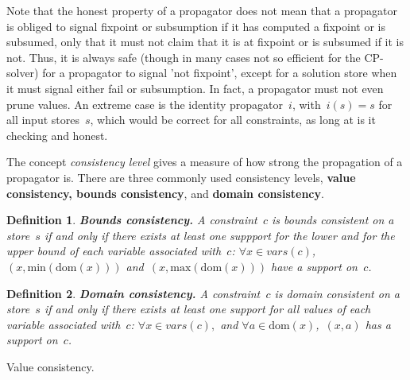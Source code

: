 \documentclass[a4paper,11pt]{article}
\newtheorem{definition}{Definition}
\newcommand{\Todo}[1]{{\color{blue}#1}}
\newcommand{\Dom}[1]{\text{dom}({#1})}
\numberwithin{equation}{section}
\begin{document}
Note that the honest property of a propagator does not mean that a
propagator is obliged to signal fixpoint or subsumption
if it has computed a fixpoint or is subsumed, only that it must not 
claim that it is at fixpoint or is subsumed if it is not. 
Thus, it is always safe 
(though in many cases not so efficient for the CP-solver)
for a propagator to signal 'not fixpoint', except for a solution store
when it must signal either fail or subsumption.
In fact, a propagator must not even prune values. An extreme case is
the identity propagator~$i$, with~$i(s) = s$ for all input stores~$s$,
which would be correct
for all constraints, as long at is it checking and honest.

The concept \emph{consistency level} gives a measure of how strong
the propagation of a propagator is.
There are three commonly used consistency levels,
\textbf{value consistency, bounds consistency}, and \textbf{domain consistency}.


\begin{definition}
  \textbf{Bounds consistency.} A constraint~$c$ is bounds consistent on a store~$s$ 
  if and only if there exists at least one suppport for the lower and for the upper bound of
  each variable associated with~$c$: $\forall x \in vars(c)$,~$(x,\text{min}(\Dom{x}))$
  and~$(x,\text{max}(\Dom{x}))$ 
  have a support on~$c$.
\end{definition}

\begin{definition}
  \textbf{Domain consistency.} A constraint~$c$ is domain consistent on a store~$s$ 
  if and only if there exists at least one support for all values of each variable
  associated with~$c$:
  $\forall x \in vars(c),$ and $\forall a \in \Dom{x}$,~$(x,a)$ 
  has a support on~$c$.
\end{definition}

\Todo{Value consistency}.
\end{document}
